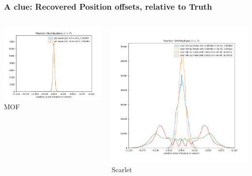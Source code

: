 \documentclass{beamer}
\begin{document}
\frame
{

    \frametitle{A clue: Recovered Position offsets, relative to Truth}

    \begin{columns}
        \begin{column}{0.5\textwidth}
            \centering
            \includegraphics[width=\textwidth]{mof-posit-r7-lownoise.png}
            \newline
            MOF
        \end{column}
        \begin{column}{0.5\textwidth}
            \centering
            \includegraphics[width=\textwidth]{scar-posit-r7-lownoise.png}
            \newline
            Scarlet
        \end{column}
    \end{columns}

}
\end{document}
